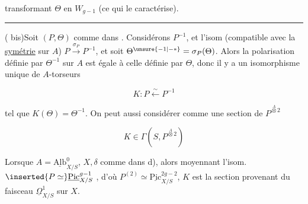 
transformant $\Theta$ en $W_{g-1}$ (ce qui le caractérise).

\begin{center}\rule{1.8em}{0.7pt}\end{center}

     

 ( bis)\qquad Soit $(P,\Theta)$ comme dans . Considérons  $P^{-1}$, et l'isom (compatible avec la \uline{symétrie} sur $A$) $P\xrightarrow{\sigma_P}P^{-1}$, et soit $\Theta^{\unsure{-1|-*}}=\sigma_P(\Theta)$. Alors la polarisation définie par $\Theta^{-1}$ sur $A$ est égale à celle définie par $\Theta$, donc il y a un isomorphisme unique de $A$-torseurs

\[
K\colon P\xleftarrow{\sim}P^{-1}
\]

tel que $K(\Theta)=\Theta^{-1}$. On peut aussi considérer  comme une section de $P^{\overset A\otimes 2}$

\[
K\in\Gamma(S,P^{\overset A\otimes 2})
\]



Lorsque $A=\underline{\mathrm{Alb}}^0_{X/S}$, $X,\delta$ comme dans d), alors  moyennant l'isom. $\inserted{P\simeq}\underline{\mathrm{Pic}}^{g-1}_{X/S}$ , d'où $P^{(2)}\simeq\underline{\mathrm{Pic}}^{2g-2}_{X/S}$, $K$ est la section provenant du  faisceau $\underline{\Omega}^1_{X/S}$ sur $X$.
